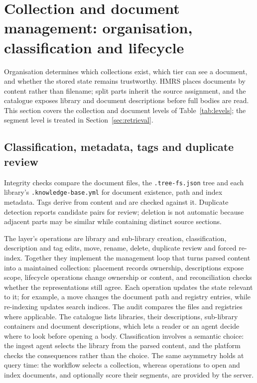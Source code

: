 \section{Collection and document management: organisation, classification and
lifecycle}
\label{sec:organization}

Organisation determines which collections exist, which tier can see a
document, and whether the stored state remains trustworthy. HMRS places
documents by content rather than filename; split parts inherit the source
assignment, and the catalogue exposes library and document descriptions
before full bodies are read. This section covers the collection and document
levels of Table~\ref{tab:levels}; the segment level is treated in
Section~\ref{sec:retrieval}.

\subsection{Classification, metadata, tags and duplicate review}
\label{sec:org-placement}
\label{sec:org-registries}
\label{sec:org-tags}
\label{sec:org-dedup}

Integrity checks compare the document files, the \texttt{.tree-fs.json} tree
and each library's \texttt{.knowledge-base.yml} for document existence, path
and index metadata. Tags derive from content and are checked against it.
Duplicate detection reports candidate pairs for review; deletion is not
automatic because adjacent parts may be similar while containing distinct
source sections.

The layer's operations are library and sub-library creation, classification,
description and tag edits, move, rename, delete, duplicate review and forced
re-index. Together they implement the management loop that turns parsed content
into a maintained collection: placement records ownership, descriptions expose
scope, lifecycle operations change ownership or content, and reconciliation
checks whether the representations still agree. Each operation updates the
state relevant to it; for example, a move changes the document path and
registry entries, while re-indexing updates search indices. The audit compares
the files and registries where applicable. The catalogue lists libraries, their
descriptions, sub-library containers and document descriptions, which lets a
reader or an agent decide where to look before opening a body. Classification
involves a semantic choice: the ingest agent
selects the library from the parsed content, and the platform checks the
consequences rather than the choice. The same asymmetry holds at query time: the workflow selects a collection,
whereas operations to open and index documents, and optionally score their
segments, are provided by the server.

